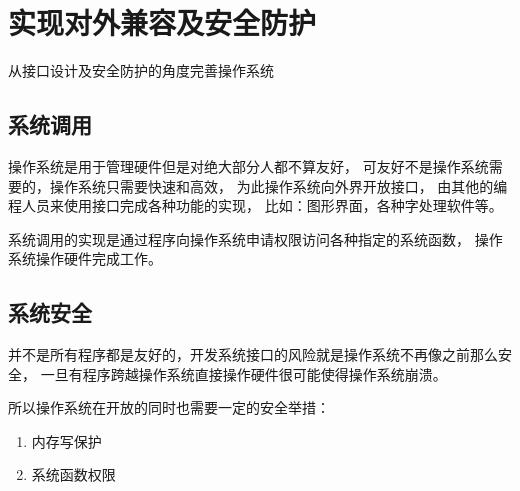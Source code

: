 \chapter{实现对外兼容及安全防护}

从接口设计及安全防护的角度完善操作系统

\section{系统调用}

操作系统是用于管理硬件但是对绝大部分人都不算友好，
可友好不是操作系统需要的，操作系统只需要快速和高效，
为此操作系统向外界开放接口，
由其他的编程人员来使用接口完成各种功能的实现，
比如：图形界面，各种字处理软件等。

系统调用的实现是通过程序向操作系统申请权限访问各种指定的系统函数，
操作系统操作硬件完成工作。

\section{系统安全}

并不是所有程序都是友好的，开发系统接口的风险就是操作系统不再像之前那么安全，
一旦有程序跨越操作系统直接操作硬件很可能使得操作系统崩溃。

所以操作系统在开放的同时也需要一定的安全举措：
\begin{enumerate}
    \item 内存写保护
    \item 系统函数权限
\end{enumerate}